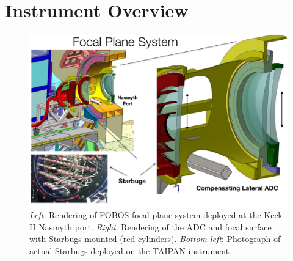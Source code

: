 

\section{Instrument Overview}
\label{sec:concept}


\begin{figure}[h!]
\vskip -0.1in
\includegraphics[width=\textwidth]{figs/FOBOS_FocalPlane.pdf}
\caption{\small {\it
Left}: Rendering of FOBOS focal plane system deployed at the Keck II
Nasmyth port. {\it Right}: Rendering of the ADC and focal surface with
Starbugs mounted (red cylinders). {\it Bottom-left}: Photograph of actual Starbugs
deployed on the TAIPAN instrument.}
\label{fig:focalplane}
\end{figure}


